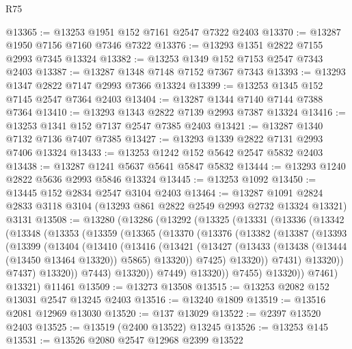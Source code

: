 \begin{lexlean}{R75}
\begin{coremodule}
@13365 := @13253 @1951 @152 @7161 @2547 @7322 @2403
@13370 := @13287 @1950 @7156 @7160 @7346 @7322
@13376 := @13293 @1351 @2822 @7155 @2993 @7345 @13324
@13382 := @13253 @1349 @152 @7153 @2547 @7343 @2403
@13387 := @13287 @1348 @7148 @7152 @7367 @7343
@13393 := @13293 @1347 @2822 @7147 @2993 @7366 @13324
@13399 := @13253 @1345 @152 @7145 @2547 @7364 @2403
@13404 := @13287 @1344 @7140 @7144 @7388 @7364
@13410 := @13293 @1343 @2822 @7139 @2993 @7387 @13324
@13416 := @13253 @1341 @152 @7137 @2547 @7385 @2403
@13421 := @13287 @1340 @7132 @7136 @7407 @7385
@13427 := @13293 @1339 @2822 @7131 @2993 @7406 @13324
@13433 := @13253 @1242 @152 @5642 @2547 @5832 @2403
@13438 := @13287 @1241 @5637 @5641 @5847 @5832
@13444 := @13293 @1240 @2822 @5636 @2993 @5846 @13324
@13445 := @13253 @1092
@13450 := @13445 @152 @2834 @2547 @3104 @2403
@13464 := @13287
    @1091
    @2824
    @2833
    @3118
    @3104
    (@13293 @861 @2822 @2549 @2993 @2732 @13324 @13321)
    @3131
@13508 := @13280
    (@13286
      (@13292
        (@13325
          (@13331
            (@13336
              (@13342
                (@13348
                  (@13353
                    (@13359
                      (@13365
                        (@13370
                          (@13376
                            (@13382
                              (@13387
                                (@13393
                                  (@13399
                                    (@13404
                                      (@13410
                                        (@13416
                                          (@13421
                                            (@13427
                                              (@13433
                                                (@13438 (@13444 (@13450 @13464 @13320)) @5865)
                                                @13320))
                                            @7425)
                                          @13320))
                                      @7431)
                                    @13320))
                                @7437)
                              @13320))
                          @7443)
                        @13320))
                    @7449)
                  @13320))
              @7455)
            @13320))
        @7461)
      @13321)
    @11461
@13509 := @13273 @13508
@13515 := @13253 @2082 @152 @13031 @2547 @13245 @2403
@13516 := @13240 @1809
@13519 := @13516 @2081 @12969 @13030
@13520 := @137 @13029
@13522 := @2397 @13520 @2403
@13525 := @13519 (@2400 @13522) @13245
@13526 := @13253 @145
@13531 := @13526 @2080 @2547 @12968 @2399 @13522

\end{coremodule}
\end{lexlean}
